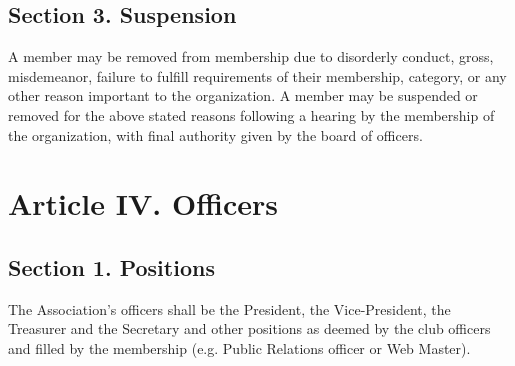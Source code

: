 \documentclass{article}
\begin{document}
  \subsection{Section 3. Suspension}
    A member may be removed from membership due to disorderly conduct, gross, misdemeanor, failure to fulfill requirements of their membership, category, or any other reason important to the organization. A member may be suspended or removed for the above stated reasons following a hearing by the membership of the organization, with final authority given by the board of officers.

\section{Article IV. Officers}
  \subsection{Section 1. Positions}
    The Association’s officers shall be the President, the Vice-President, the Treasurer and the Secretary and other positions as deemed by the club officers and filled by the membership (e.g. Public Relations officer or Web Master).
\end{document}
